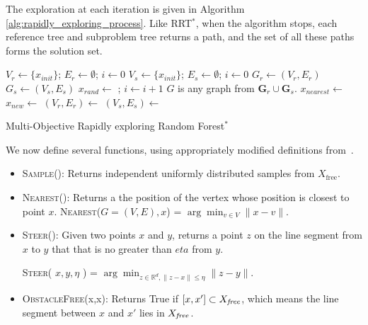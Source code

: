 \documentclass{article}
\begin{document}
The exploration at each iteration is given in Algorithm \ref{alg:rapidly_exploring_process}.  Like RRT$^{*}$, when the algorithm stops, each reference tree and subproblem tree returns a path, and the set of all these paths forms the solution set.

\begin{algorithm}
	\begin{algorithmic}[1]
		\State $ V_{r} \leftarrow \{ x_{init} \} $; $ E_{r} \leftarrow \emptyset $; $ i \leftarrow 0 $
		\EndFor
		\State $ V_{s} \leftarrow \{ x_{init} \} $; $ E_{s} \leftarrow \emptyset $; $ i \leftarrow 0 $
		\EndFor
		\State $ G_{r} \leftarrow (V_{r}, E_{r}) $
		\EndFor
		\State $ G_{s} \leftarrow (V_{s}, E_{s}) $
		\EndFor
		\State $ x_{rand} \leftarrow $  ; $ i \leftarrow i + 1 $
		\State $G$ is any graph from ${\mathbf G}_r\cup {\mathbf G}_s$.
		\State $ x_{nearest} \leftarrow $ 
		\State $ x_{new} \leftarrow $ 
		\State $ (V_{r}, E_{r}) \leftarrow $ 
		\EndFor
		\State $ (V_{s}, E_{s}) \leftarrow $ 
		\EndFor
		\EndIf
		\EndWhile
	\end{algorithmic}
	\caption{Multi-Objective Rapidly exploring Random Forest$^{*}$ }
	\label{alg:rapidly_exploring_process}
\end{algorithm}

We now define several functions, using appropriately modified definitions from~\cite{Karaman.Frazzoli:RSS10}.
\begin{itemize}
\item \textsc{Sample}():
Returns independent uniformly distributed samples from $ X_{\mbox{free}} $. 

\item \textsc{Nearest}():
Returns a the position of the vertex whose position is closest to point $ x $.
\textsc{Nearest}($ G = (V,E), x $) = $ \arg \min_{v \in V} \lVert x - v \rVert $.
	
\item \textsc{Steer}(): Given two points $ x $ and $ y $, returns a point $ z $ on the line segment from $x$ to $y$ that that is no greater than $eta$ from $y$. 

\textsc{Steer}( $ x,y,\eta $ ) = $ \arg \min_{ z \in \mathbb{R}^{d}, \lVert z -x \rVert \leq \eta } \lVert z - y \rVert $.

\item \textsc{ObstacleFree}(x,x): Returns True if $ [ x, x' ] \subset X_{\it free} $, which means the line segment between $ x $ and $ x' $ lies in $ X_{\it free} $.

\end{itemize}
\end{document}

